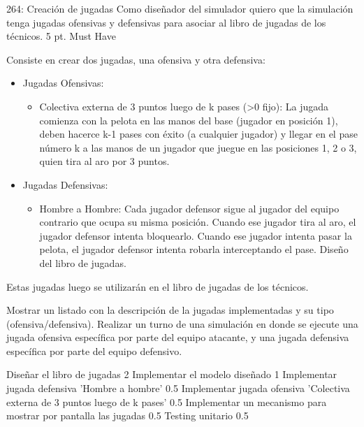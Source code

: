 \sprintstory
{264: Creación de jugadas}
{Como diseñador del simulador quiero que la simulación tenga jugadas ofensivas y defensivas para asociar al libro de jugadas de los técnicos.}
{5 pt.}
{Must Have}
{Consiste en crear dos jugadas, una ofensiva y otra defensiva:
\begin{itemize}
  \item Jugadas Ofensivas:
  	\begin{itemize}
  		\item Colectiva externa de 3 puntos luego de k pases (\textgreater0 fijo): La jugada comienza con la pelota en las manos del base (jugador en posición 1), deben hacerce k-1 pases con éxito (a cualquier jugador) y llegar en el pase número k a las manos de un jugador que juegue en las posiciones 1, 2 o 3, quien tira al aro por 3 puntos.
  	\end{itemize}
  \item Jugadas Defensivas:
	\begin{itemize}
	  		\item Hombre a Hombre: Cada jugador defensor sigue al jugador del equipo contrario que ocupa su misma posición. Cuando ese jugador tira al aro, el jugador defensor intenta bloquearlo. Cuando ese jugador intenta pasar la pelota, el jugador defensor intenta robarla interceptando el pase. Diseño del libro de jugadas.
	\end{itemize}
\end{itemize}
Estas jugadas luego se utilizar\'an en el libro de jugadas de los técnicos.}
{Mostrar un listado con la descripción de la jugadas implementadas y su tipo (ofensiva/defensiva).
Realizar un turno de una simulación en donde se ejecute una jugada ofensiva específica por parte del equipo atacante, y una jugada
defensiva específica por parte del equipo defensivo.}

\begin{taskstable}
 \task
 {Diseñar el libro de jugadas}
 {2}
 \task
 {Implementar el modelo diseñado}
 {1}
 \task
 {Implementar jugada defensiva 'Hombre a hombre'}
 {0.5}
 \task
 {Implementar jugada ofensiva 'Colectiva externa de 3 puntos luego de k pases'}
 {0.5}
 \task
 {Implementar un mecanismo para mostrar por pantalla las jugadas}
 {0.5}
 \task
 {Testing unitario}
 {0.5}

\end{taskstable}

\vspace{1cm}


